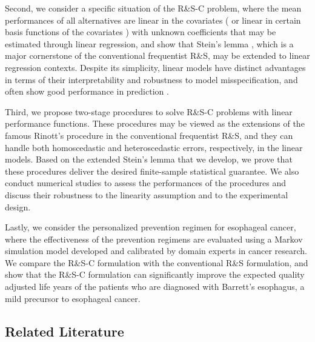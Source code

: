\documentclass[ijoc,nonblindrev]{informs3}
\begin{document}
Second, we consider a specific situation of the R\&S-C problem, where the mean performances of all alternatives are linear in the covariates
(
or linear in certain basis functions of the covariates
)
with unknown coefficients that may be estimated through linear regression,
and show that Stein's lemma \citep{stein1945}, which is a major cornerstone of the conventional frequentist R\&S, may be extended to linear regression contexts.
Despite its simplicity, linear models have distinct advantages in terms of their interpretability and robustness to model misspecification, and often show good performance in prediction \citep{james2013}.


Third, we propose two-stage procedures to solve R\&S-C problems with linear performance functions.
These procedures may be viewed as the extensions of the famous Rinott's procedure \citep{rinott1978} in the conventional frequentist R\&S, and they can handle both homoscedastic and heteroscedastic errors, respectively, in the linear models.
Based on the extended Stein's lemma that we develop, we prove that these procedures deliver the desired finite-sample statistical guarantee.
We also conduct numerical studies to assess the performances of the procedures and discuss their robustness to the linearity assumption and to the experimental design.

Lastly, we consider the personalized prevention regimen for esophageal cancer,
where the effectiveness of the prevention regimens are evaluated using a Markov simulation model developed and calibrated by domain experts in cancer research.
We compare the R\&S-C formulation with the conventional R\&S formulation,
and show that the R\&S-C formulation can significantly improve the expected quality adjusted life years of the patients who are diagnosed with Barrett's esophagus, a mild precursor to esophageal cancer.

\subsection{Related Literature}
\end{document}
